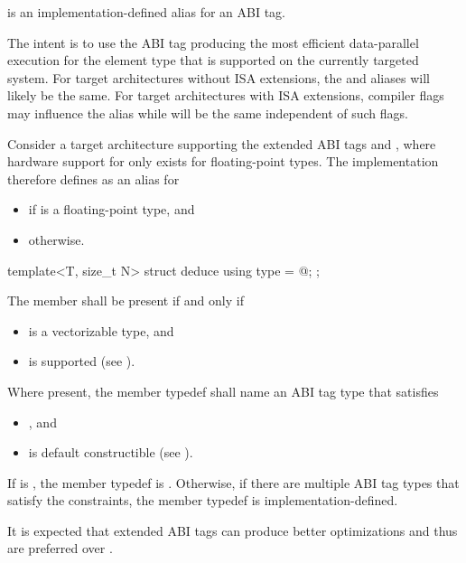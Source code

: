 \pnum
{} is an implementation-defined alias for an ABI tag. \begin{note}The intent is to use the ABI tag producing the most efficient data-parallel execution for the element type  that is supported on the currently targeted system. For target architectures without ISA extensions, the  and  aliases will likely be the same. For target architectures with ISA extensions, compiler flags may influence the  alias while  will be the same independent of such flags.\end{note}

\begin{example}
  Consider a target architecture supporting the extended ABI tags  and , where hardware support for  only exists for floating-point types. The implementation therefore defines  as an alias for
  \begin{itemize}
    \item {} if  is a floating-point type, and
    \item {} otherwise.
  \end{itemize}
\end{example}

\begin{codeblock}
  template<T, size_t N> struct deduce { using type = @\seebelow@; };
\end{codeblock}

\pnum
The member  shall be present if and only if
\begin{itemize}
  \item {} is a vectorizable type, and
  \item {} is supported (see ).
\end{itemize}

\pnum
Where present, the member typedef  shall name an ABI tag type that satisfies
\begin{itemize}
  \item {}, and
  \item {} is default constructible (see ).
\end{itemize}

If  is , the member typedef  is . Otherwise, if there are multiple ABI tag types that satisfy the constraints, the member typedef  is implementation-defined. \begin{note}It is expected that extended ABI tags can produce better optimizations and thus are preferred over .\end{note}

